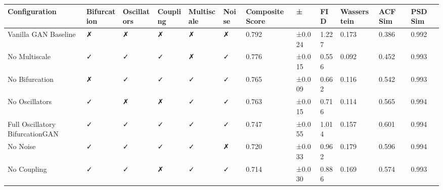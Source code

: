 \begin{tabular}{llllllllllll}
\toprule
Configuration & Bifurcation & Oscillators & Coupling & Multiscale & Noise & Composite Score & ± & FID & Wasserstein & ACF Sim & PSD Sim \\
\midrule
Vanilla GAN Baseline & ✗ & ✗ & ✗ & ✗ & ✗ & 0.792 & ±0.024 & 1.227 & 0.173 & 0.386 & 0.992 \\
No Multiscale & ✓ & ✓ & ✓ & ✗ & ✓ & 0.776 & ±0.015 & 0.556 & 0.092 & 0.452 & 0.993 \\
No Bifurcation & ✗ & ✓ & ✓ & ✓ & ✓ & 0.765 & ±0.009 & 0.662 & 0.116 & 0.542 & 0.993 \\
No Oscillators & ✓ & ✗ & ✗ & ✓ & ✓ & 0.763 & ±0.015 & 0.716 & 0.114 & 0.565 & 0.994 \\
Full Oscillatory BifurcationGAN & ✓ & ✓ & ✓ & ✓ & ✓ & 0.747 & ±0.055 & 1.014 & 0.157 & 0.601 & 0.994 \\
No Noise & ✓ & ✓ & ✓ & ✓ & ✗ & 0.720 & ±0.033 & 0.962 & 0.179 & 0.596 & 0.994 \\
No Coupling & ✓ & ✓ & ✗ & ✓ & ✓ & 0.714 & ±0.030 & 0.886 & 0.169 & 0.574 & 0.993 \\
\bottomrule
\end{tabular}
